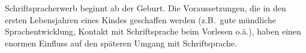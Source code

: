 Schriftspracherwerb beginnt ab der Geburt.
Die Voraussetzungen, die in den ersten Lebensjahren eines Kindes geschaffen werden (z.B.\ gute mündliche Sprachentwicklung, Kontakt mit Schriftsprache beim Vorlesen o.ä.), haben einen enormen Einfluss auf den späteren Umgang mit Schriftsprache.